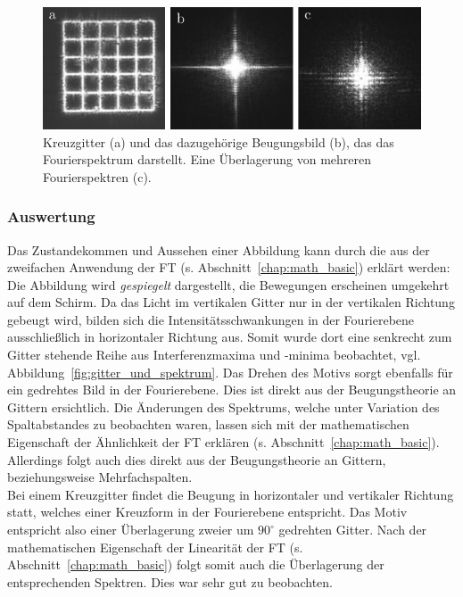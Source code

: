 \begin{figure}[ht]
	\centering
	\includegraphics{images/Regina/abb14.pdf}
	\caption[Kreuzgitter mit Fourierspektrum]{
		Kreuzgitter (a) und das dazugehörige Beugungsbild (b), das das Fourierspektrum darstellt. Eine Überlagerung von mehreren Fourierspektren (c).
	}
	\label{fig:kreuzgitter_und_spektrum}
\end{figure}



\subsubsection*{Auswertung}
Das Zustandekommen und Aussehen einer Abbildung kann durch die aus der zweifachen Anwendung der FT (s. Abschnitt~\ref{chap:math_basic}) erklärt werden: Die Abbildung wird \textit{gespiegelt} dargestellt, die Bewegungen erscheinen umgekehrt auf dem Schirm. Da das Licht im vertikalen Gitter nur in der vertikalen Richtung gebeugt wird, bilden sich die Intensitätsschwankungen in der Fourierebene ausschließlich in horizontaler Richtung aus. Somit wurde dort eine senkrecht zum Gitter stehende Reihe aus Interferenzmaxima und -minima beobachtet, vgl. Abbildung~\ref{fig:gitter_und_spektrum}. Das Drehen des Motivs sorgt ebenfalls für ein gedrehtes Bild in der Fourierebene. Dies ist direkt aus der Beugungstheorie an Gittern ersichtlich. Die Änderungen des Spektrums, welche unter Variation des Spaltabstandes zu beobachten waren, lassen sich mit der mathematischen Eigenschaft der Ähnlichkeit der FT erklären (s. Abschnitt~\ref{chap:math_basic}). Allerdings folgt auch dies direkt aus der Beugungstheorie an Gittern, beziehungsweise Mehrfachspalten.\\

Bei einem Kreuzgitter findet die Beugung in horizontaler und vertikaler Richtung statt, welches einer Kreuzform in der Fourierebene entspricht. Das Motiv entspricht also einer Überlagerung zweier um $90^\circ$ gedrehten Gitter. Nach der mathematischen Eigenschaft der Linearität der FT (s. Abschnitt~\ref{chap:math_basic}) folgt somit auch die Überlagerung der entsprechenden Spektren. Dies war sehr gut zu beobachten.

